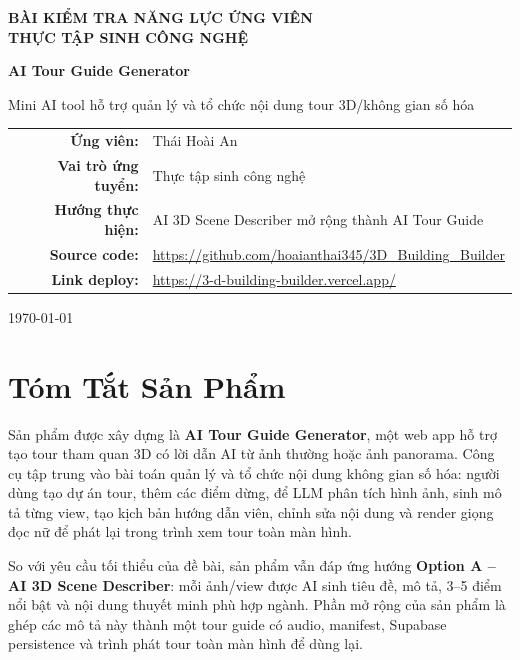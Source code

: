 \documentclass[12pt,a4paper]{article}
\begin{document}
\begin{titlepage}
  \centering
  \vspace*{1.2cm}
  {\Large\bfseries BÀI KIỂM TRA NĂNG LỰC ỨNG VIÊN\\[0.2cm]
  THỰC TẬP SINH CÔNG NGHỆ\par}
  \vspace{1.6cm}
  {\Huge\bfseries AI Tour Guide Generator\par}
  \vspace{0.4cm}
  {\Large Mini AI tool hỗ trợ quản lý và tổ chức nội dung tour 3D/không gian số hóa\par}
  \vspace{1.4cm}
  \begin{tabular}{rl}
    \textbf{Ứng viên:} & Thái Hoài An \\
    \textbf{Vai trò ứng tuyển:} & Thực tập sinh công nghệ \\
    \textbf{Hướng thực hiện:} & AI 3D Scene Describer mở rộng thành AI Tour Guide \\
    \textbf{Source code:} & \url{https://github.com/hoaianthai345/3D_Building_Builder} \\
    \textbf{Link deploy:} & \url{https://3-d-building-builder.vercel.app/} \\
  \end{tabular}
  \vfill
  {\large \today\par}
\end{titlepage}

\tableofcontents
\newpage

\section{Tóm Tắt Sản Phẩm}

Sản phẩm được xây dựng là \textbf{AI Tour Guide Generator}, một web app hỗ trợ tạo tour tham quan 3D có lời dẫn AI từ ảnh thường hoặc ảnh panorama. Công cụ tập trung vào bài toán quản lý và tổ chức nội dung không gian số hóa: người dùng tạo dự án tour, thêm các điểm dừng, để LLM phân tích hình ảnh, sinh mô tả từng view, tạo kịch bản hướng dẫn viên, chỉnh sửa nội dung và render giọng đọc nữ để phát lại trong trình xem tour toàn màn hình.

So với yêu cầu tối thiểu của đề bài, sản phẩm vẫn đáp ứng hướng \textbf{Option A -- AI 3D Scene Describer}: mỗi ảnh/view được AI sinh tiêu đề, mô tả, 3--5 điểm nổi bật và nội dung thuyết minh phù hợp ngành. Phần mở rộng của sản phẩm là ghép các mô tả này thành một tour guide có audio, manifest, Supabase persistence và trình phát tour toàn màn hình để dùng lại.
\end{document}
